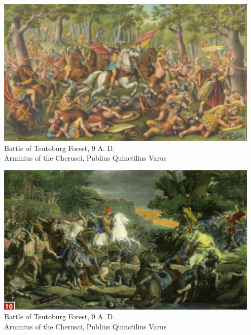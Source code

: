 \begin{frame}
    \centering
    \includegraphics[width=0.95\textwidth]{img/teutoburg.png} \\
    Battle of Teutoburg Forest, 9 A. D. \\
        Arminius of the Cherusci, Publius Quinctilius Varus \\
\end{frame}

\begin{frame}
    \centering
    \includegraphics[width=0.95\textwidth]{img/teutoberg.jpg} \\
    Battle of Teutoburg Forest, 9 A. D. \\
        Arminius of the Cherusci, Publius Quinctilius Varus \\
\end{frame}

